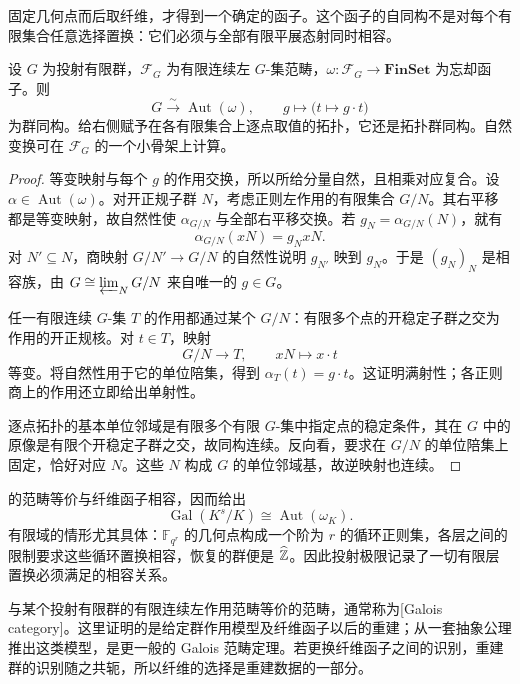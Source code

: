 固定几何点而后取纤维，才得到一个确定的函子。这个函子的自同构不是对每个有限集合任意选择置换：它们必须与全部有限平展态射同时相容。

\begin{theorem}\label{b4:thm:galois-fiber-reconstruction}
	设 \(G\) 为投射有限群，\(\mathcal F_G\) 为有限连续左 \(G\)-集范畴，\(\omega:\mathcal F_G\to\mathbf{FinSet}\) 为忘却函子。则
	\[
		G\xrightarrow{\sim}\operatorname{Aut}(\omega), \qquad g\longmapsto\bigl(t\mapsto g\cdot t\bigr)
	\]
	为群同构。给右侧赋予在各有限集合上逐点取值的拓扑，它还是拓扑群同构。自然变换可在 \(\mathcal F_G\) 的一个小骨架上计算。
\end{theorem}
\begin{proof}
	等变映射与每个 \(g\) 的作用交换，所以所给分量自然，且相乘对应复合。设 \(\alpha\in\operatorname{Aut}(\omega)\)。对开正规子群 \(N\)，考虑正则左作用的有限集合 \(G/N\)。其右平移都是等变映射，故自然性使 \(\alpha_{G/N}\) 与全部右平移交换。若 \(g_N=\alpha_{G/N}(N)\)，就有
	\[
		\alpha_{G/N}(xN)=g_NxN.
	\]
	对 \(N'\subseteq N\)，商映射 \(G/N'\to G/N\) 的自然性说明 \(g_{N'}\) 映到 \(g_N\)。于是 \((g_N)_N\) 是相容族，由 \(G\cong\varprojlim_NG/N\) 来自唯一的 \(g\in G\)。

	任一有限连续 \(G\)-集 \(T\) 的作用都通过某个 \(G/N\)：有限多个点的开稳定子群之交为作用的开正规核。对 \(t\in T\)，映射
	\[
		G/N\longrightarrow T,\qquad xN\longmapsto x\cdot t
	\]
	等变。将自然性用于它的单位陪集，得到 \(\alpha_T(t)=g\cdot t\)。这证明满射性；各正则商上的作用还立即给出单射性。

	逐点拓扑的基本单位邻域是有限多个有限 \(G\)-集中指定点的稳定条件，其在 \(G\) 中的原像是有限个开稳定子群之交，故同构连续。反向看，要求在 \(G/N\) 的单位陪集上固定，恰好对应 \(N\)。这些 \(N\) 构成 \(G\) 的单位邻域基，故逆映射也连续。
\end{proof}

的范畴等价与纤维函子相容，因而给出
\[
	\operatorname{Gal}(K^s/K)\cong\operatorname{Aut}(\omega_K).
\]
有限域的情形尤其具体：\(\mathbb F_{q^r}\) 的几何点构成一个阶为 \(r\) 的循环正则集，各层之间的限制要求这些循环置换相容，恢复的群便是 \(\widehat{\vphantom{Z}\mathbb Z}\)。因此投射极限记录了一切有限层置换必须满足的相容关系。

\ProseParagraphBreak
与某个投射有限群的有限连续左作用范畴等价的范畴，通常称为[Galois category]。这里证明的是给定群作用模型及纤维函子以后的重建；从一套抽象公理推出这类模型，是更一般的 Galois 范畴定理。若更换纤维函子之间的识别，重建群的识别随之共轭，所以纤维的选择是重建数据的一部分。

